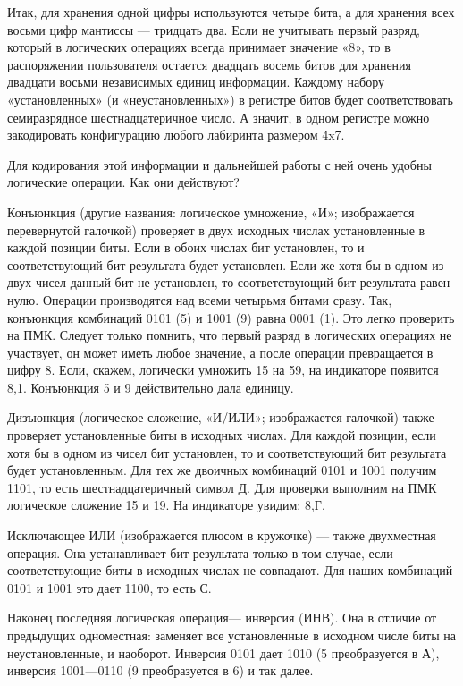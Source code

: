 \documentclass[11pt,a4paper,oneside]{article}
\begin{document}
Итак, для хранения одной цифры используются четыре бита, а для хранения всех восьми цифр мантиссы — тридцать два. Если не учитывать первый разряд, который в логических операциях  всегда принимает значение «8», то в распоряжении пользователя остается двадцать восемь битов для хранения двадцати восьми независимых единиц информации. Каждому набору «установленных» (и «неустановленных») в регистре битов будет соответствовать семиразрядное шестнадцатеричное число. А значит, в одном регистре можно закодировать конфигурацию любого лабиринта размером 4x7.

Для кодирования этой информации и дальнейшей работы с ней очень удобны логические операции. Как они действуют?

Конъюнкция (другие названия: логическое умножение, «И»; изображается перевернутой галочкой) проверяет в двух исходных числах установленные в каждой позиции биты. Если в обоих числах бит установлен, то и соответствующий бит результата будет установлен. Если же хотя бы в одном из двух чисел данный бит не установлен, то соответствующий бит результата равен нулю. Операции производятся над всеми четырьмя битами сразу. Так, конъюнкция комбинаций 0101 (5) и 1001 (9) равна 0001 (1). Это легко проверить на ПМК. Следует только помнить, что первый разряд в логических операциях не участвует, он может иметь любое значение, а после операции превращается в цифру 8. Если, скажем, логически умножить 15 на 59, на индикаторе появится 8,1. Конъюнкция 5 и 9 действительно дала единицу.

Дизъюнкция (логическое сложение, «И/ИЛИ»; изображается галочкой) также проверяет установленные биты в исходных числах. Для каждой позиции, если хотя бы в одном из чисел бит установлен, то и соответствующий бит результата будет установленным. Для тех же двоичных комбинаций 0101 и 1001 получим 1101, то есть шестнадцатеричный символ Д. Для проверки выполним на ПМК логическое сложение 15 и 19. На индикаторе увидим: 8,Г.

Исключающее ИЛИ (изображается плюсом в кружочке) — также двухместная операция. Она устанавливает бит результата только в том случае, если соответствующие биты в исходных числах не совпадают. Для наших комбинаций 0101 и 1001 это дает 1100, то есть С.

Наконец последняя логическая операция— инверсия (ИНВ). Она в отличие от предыдущих одноместная: заменяет все установленные в исходном числе биты на неустановленные, и наоборот. Инверсия  0101 дает 1010 (5 преобразуется в А), инверсия 1001—0110 (9 преобразуется в 6) и так далее.
\end{document}
